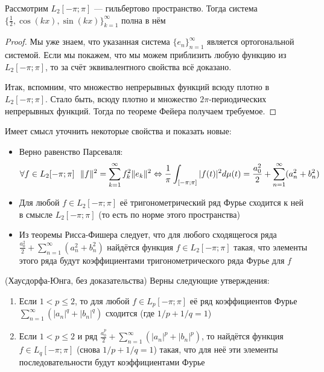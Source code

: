 \begin{proposition}
	Рассмотрим $L_2[-\pi; \pi]$ --- гильбертово пространство. Тогда система $\{\frac{1}{2}, \cos(kx), \sin(kx)\}_{k = 1}^\infty$ полна в нём
\end{proposition}

\begin{proof}
	Мы уже знаем, что указанная система $\{e_n\}_{n = 1}^\infty$ является ортогональной системой. Если мы покажем, что мы можем приблизить любую функцию из $L_2[-\pi; \pi]$, то за счёт эквивалентного свойства всё доказано.
	
	Итак, вспомним, что множество непрерывных функций всюду плотно в $L_2[-\pi; \pi]$. Стало быть, всюду плотно и множество $2\pi$-периодических непрерывных функций. Тогда по теореме Фейера получаем требуемое.
\end{proof}

\begin{corollary}
	Имеет смысл уточнить некоторые свойства и показать новые:
	\begin{itemize}
		\item Верно равенство Парсеваля:
		\[
			\forall f \in L_2[-\pi; \pi]\ \ \|f\|^2 = \sum_{k = 1}^\infty f_k^2\|e_k\|^2 \Leftrightarrow \frac{1}{\pi} \int_{[-\pi; \pi]} |f(t)|^2d\mu(t) = \frac{a_0^2}{2} + \sum_{n = 1}^\infty (a_n^2 + b_n^2)
		\]
		
		\item Для любой $f \in L_2[-\pi; \pi]$ её тригонометрический ряд Фурье сходится к ней в смысле $L_2[-\pi; \pi]$ (то есть по норме этого пространства)
		
		\item Из теоремы Рисса-Фишера следует, что для любого сходящегося ряда $\frac{a_0^2}{2} + \sum_{n = 1}^\infty (a_n^2 + b_n^2)$ найдётся функция $f \in L_2[-\pi; \pi]$ такая, что элементы этого ряда будут коэффициентами тригонометрического ряда Фурье для $f$
	\end{itemize}
\end{corollary}

\begin{theorem} (Хаусдорфа-Юнга, без доказательства)
	Верны следующие утверждения:
	\begin{enumerate}
		\item Если $1 < p \le 2$, то для любой $f \in L_p[-\pi; \pi]$ её ряд коэффициентов Фурье $\sum_{n = 1}^\infty (|a_n|^q + |b_n|^q)$ сходится (где $1 / p + 1 / q = 1$)
		
		\item Если $1 < p \le 2$ и ряд $\frac{a_0^p}{2} + \sum_{n = 1}^\infty (|a_n|^p + |b_n|^p)$, то найдётся функция $f \in L_q[-\pi; \pi]$ (снова $1 / p + 1 / q = 1$) такая, что для неё эти элементы последовательности будут коэффициентами Фурье 
	\end{enumerate}
\end{theorem}

